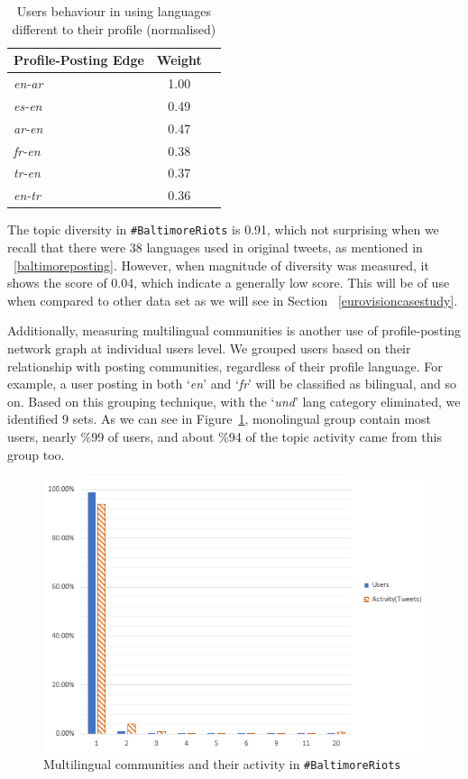 \begin{table}[!htb]
\centering
\begin{tabular}{@{}lcr@{}}
\toprule
\textbf{Profile-Posting Edge} & \textbf{Weight} \\ \midrule
{\emph{en-ar}} & 1.00 \\
{\emph{es-en}} & 0.49 \\
{\emph{ar-en}} & 0.47\\ 
{\emph{fr-en}} & 0.38 \\
{\emph{tr-en}} & 0.37 \\
{\emph{en-tr}} & 0.36 \\ \bottomrule
\end{tabular}
\caption{Users behaviour in using languages different to their profile (normalised)}
\label{tbl:baltimoredifflang}
\end{table}


The topic diversity in  {\texttt{\#BaltimoreRiots}} is 0.91, which not surprising 
when we recall that there were 38 languages used in original tweets, as mentioned in 
~\ref{baltimoreposting}. However, when magnitude of diversity was measured, 
it shows the score of 0.04, which indicate a generally low score. This will be of use
when compared to other data set as we will see in Section ~\ref{eurovisioncasestudy}.

Additionally, measuring multilingual communities is another use of profile-posting network 
graph at individual users level. We grouped users based on their relationship with
posting communities, regardless of their profile language. For
example, a user posting in both `{\emph{en}}' and `{\emph{fr}}' will
be classified as bilingual, and so on. Based on this grouping
technique, with the `{\emph{und}}' lang category eliminated, we
identified 9 sets. As we can see in Figure~\ref{fig:baltimore_multilingual}, 
monolingual group contain most users, nearly \%99 of users, and about 
\%94 of the topic activity came from this group too.


\begin{figure}
\centering
\includegraphics[width=\columnwidth]{images/baltimore_multilingual.png}
\caption{Multilingual communities and their activity in {\texttt{\#BaltimoreRiots}}}
\label{fig:baltimore_multilingual}
\end{figure}


